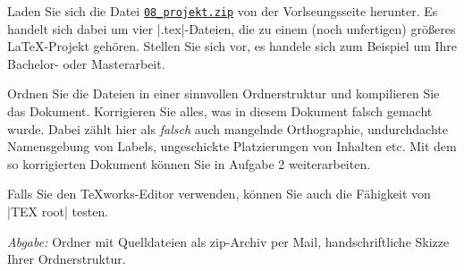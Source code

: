 \documentclass{scrartcl}
\newcommand{\abgabe}[1]{\par\noindent\textit{Abgabe:} #1}
\begin{document}
\begin{question}[subtitle=Struktur eines umfangreichen Dokuments]{6}
	Laden Sie sich die Datei \href{http://latexkurs.de/uebungen/08_projekt.zip}{\texttt{08\_projekt.zip}} von der Vorlseungsseite herunter. Es handelt sich dabei um vier |.tex|-Dateien, die zu einem (noch unfertigen) größeres \LaTeX-Projekt gehören. Stellen Sie sich vor, es handele sich zum Beispiel um Ihre Bachelor- oder Masterarbeit.
	
	Ordnen Sie die Dateien in einer sinnvollen Ordnerstruktur und kompilieren Sie das Dokument. Korrigieren Sie alles, was in diesem Dokument falsch gemacht wurde. Dabei zählt hier als \emph{falsch} auch mangelnde Orthographie, undurchdachte Namensgebung von Labels, ungeschickte Platzierungen von Inhalten etc. Mit dem so korrigierten Dokument können Sie in Aufgabe 2 weiterarbeiten.

	Falls Sie den \TeX works-Editor verwenden, können Sie auch die Fähigkeit von |TEX root| testen.
	
	\abgabe{Ordner mit Quelldateien als zip-Archiv per Mail, handschriftliche Skizze Ihrer Ordnerstruktur.}
\end{question}
\end{document}
